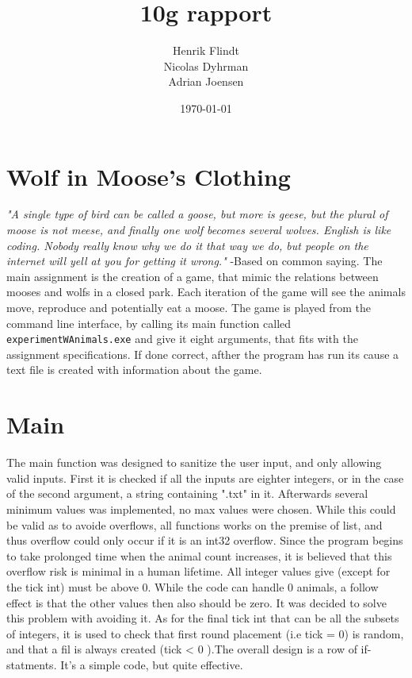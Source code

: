\documentclass{article}
\title{10g rapport}
\author{Henrik Flindt\\Nicolas Dyhrman\\Adrian Joensen}
\date{\today}
\begin{document}
    \maketitle
    
    \section*{Wolf in Moose's Clothing}
    \textit{"A single type of bird can be called a goose, but more is geese, but the plural of moose is not meese, and finally one wolf becomes several wolves. English is like coding. Nobody really know why we do it that way we do, but people on the internet will yell at you for getting it wrong."} \newline -Based on common saying. \newline \newline
    The main assignment is the creation of a game, that mimic the relations between mooses and wolfs in a closed park. Each iteration of the game will see the animals move, reproduce and potentially eat a moose. The game is played from the command line interface, by calling its main function called \verb|experimentWAnimals.exe| and give it eight arguments, that fits with the assignment specifications. If done correct, afther the program has run its cause a text file is created with information about the game. 
    
    \section{Main}
    The main function was designed to sanitize the user input, and only allowing valid inputs. First it is checked if all the inputs are eighter integers, or in the case of the second argument, a string containing ".txt" in it. \newline Afterwards several minimum values was implemented, no max values were chosen. While this could be valid as to avoide overflows, all functions works on the premise of list, and thus overflow could only occur if it is an int32 overflow. Since the program begins to take prolonged time when the animal count increases, it is believed that this overflow risk is minimal in a human lifetime. All integer values give (except for the tick int) must be above 0. \newline While the code can handle 0 animals, a follow effect is that the other values then also should be zero. It was decided to solve this problem with avoiding it. As for the final tick int that can be all the subsets of integers, it is used to check that first round placement (i.e tick = 0) is random, and that a fil is always created (tick < 0 ).\newline The overall design is a row of if-statments. It's a simple code, but quite effective. 
    
\end{document}

